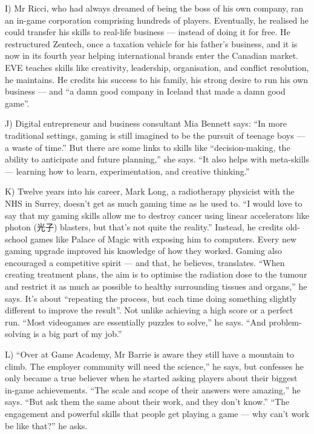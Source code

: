 \documentclass[UTF8,11pt]{ctexart}
\begin{document}
I) Mr Ricci, who had always dreamed of being the boss of his own company, ran an in-game corporation comprising hundreds of players. Eventually, he realised he could transfer his skills to real-life business — instead of doing it for free. He restructured Zentech, once a taxation vehicle for his father’s business, and it is now in its fourth year helping international brands enter the Canadian market. EVE teaches skills like creativity, leadership, organisation, and conflict resolution, he maintains. He credits his success to his family, his strong desire to run his own business — and “a damn good company in Iceland that made a damn good game”.


J) Digital entrepreneur and business consultant Mia Bennett says: “In more traditional settings, gaming is still imagined to be the pursuit of teenage boys — a waste of time.” But there are some links to skills like “decision-making, the ability to anticipate and future planning,” she says. “It also helps with meta-skills — learning how to learn, experimentation, and creative thinking.”


K) Twelve years into his career, Mark Long, a radiotherapy physicist with the NHS in Surrey, doesn’t get as much gaming time as he used to. “I would love to say that my gaming skills allow me to destroy cancer using linear accelerators like photon (光子) blasters, but that’s not quite the reality.” Instead, he credits old-school games like Palace of Magic with exposing him to computers. Every new gaming upgrade improved his knowledge of how they worked. Gaming also encouraged a competitive spirit — and that, he believes, translates. “When creating treatment plans, the aim is to optimise the radiation dose to the tumour and restrict it as much as possible to healthy surrounding tissues and organs,” he says. It’s about “repeating the process, but each time doing something slightly different to improve the result”. Not unlike achieving a high score or a perfect run. “Most videogames are essentially puzzles to solve,” he says. “And problem-solving is a big part of my job.”


L) “Over at Game Academy, Mr Barrie is aware they still have a mountain to climb. The employer community will need the science,” he says, but confesses he only became a true believer when he started asking players about their biggest in-game achievements. “The scale and scope of their answers were amazing,” he says. “But ask them the same about their work, and they don’t know.” “The engagement and powerful skills that people get playing a game — why can’t work be like that?” he asks.
\end{document}
